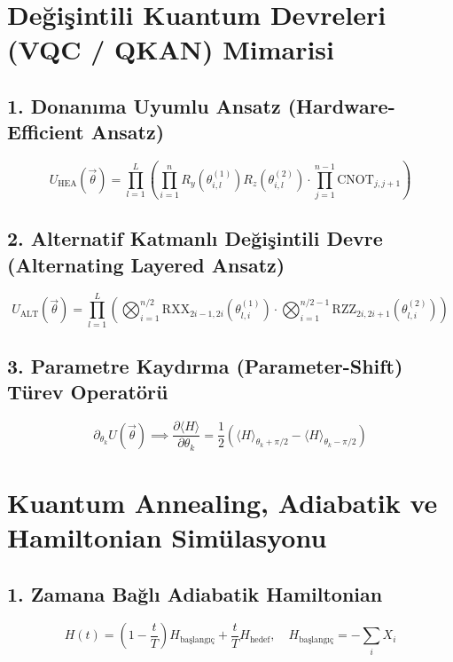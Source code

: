 \documentclass[11pt, a4paper]{article}
\begin{document}
\section{Değişintili Kuantum Devreleri (VQC / QKAN) Mimarisi}

\subsection{1. Donanıma Uyumlu Ansatz (Hardware-Efficient Ansatz)}
\begin{equation}
U_{\text{HEA}}(\vec{\theta}) = \prod_{l=1}^L \left( \prod_{i=1}^n R_y(\theta_{i,l}^{(1)}) R_z(\theta_{i,l}^{(2)}) \cdot \prod_{j=1}^{n-1} \text{CNOT}_{j, j+1} \right)
\end{equation}

\subsection{2. Alternatif Katmanlı Değişintili Devre (Alternating Layered Ansatz)}
\begin{equation}
U_{\text{ALT}}(\vec{\theta}) = \prod_{l=1}^L \left( \bigotimes_{i=1}^{n/2} \text{RXX}_{2i-1, 2i}(\theta_{l,i}^{(1)}) \cdot \bigotimes_{i=1}^{n/2-1} \text{RZZ}_{2i, 2i+1}(\theta_{l,i}^{(2)}) \right)
\end{equation}

\subsection{3. Parametre Kaydırma (Parameter-Shift) Türev Operatörü}
\begin{equation}
\partial_{\theta_k} U(\vec{\theta}) \implies \frac{\partial \langle H \rangle}{\partial \theta_k} = \frac{1}{2} \left( \langle H \rangle_{\theta_k + \pi/2} - \langle H \rangle_{\theta_k - \pi/2} \right)
\end{equation}

\section{Kuantum Annealing, Adiabatik ve Hamiltonian Simülasyonu}

\subsection{1. Zamana Bağlı Adiabatik Hamiltonian}
\begin{equation}
H(t) = \left( 1 - \frac{t}{T} \right) H_{\text{başlangıç}} + \frac{t}{T} H_{\text{hedef}}, \quad H_{\text{başlangıç}} = -\sum_i X_i
\end{equation}
\end{document}
